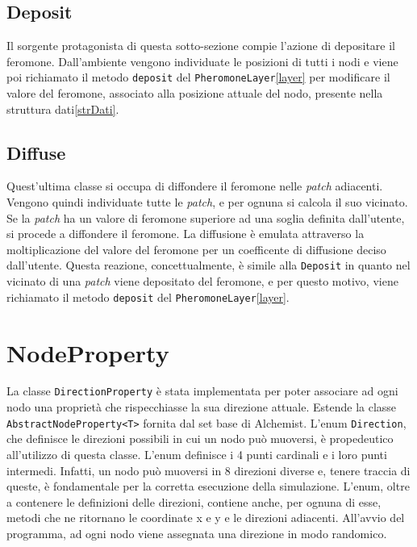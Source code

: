 \subsection{Deposit}
Il sorgente protagonista di questa sotto-sezione compie l'azione di depositare il feromone. Dall'ambiente
vengono individuate le posizioni di tutti i nodi e viene poi richiamato il metodo \texttt{deposit} del \texttt{PheromoneLayer}\space\ref{layer}
per modificare il valore del feromone, associato alla posizione attuale del nodo, presente nella struttura dati\space\ref{strDati}.\newline


\subsection{Diffuse}
Quest'ultima classe si occupa di diffondere il feromone nelle \textit{patch} adiacenti. Vengono quindi individuate tutte
le \textit{patch}, e per ognuna si calcola il suo vicinato. Se la \textit{patch} ha un valore di feromone superiore ad una soglia definita dall'utente,
si procede a diffondere il feromone. La diffusione è emulata attraverso la moltiplicazione del valore del feromone
per un coefficente di diffusione deciso dall'utente. Questa reazione, concettualmente, è simile alla \texttt{Deposit} in quanto
nel vicinato di una \textit{patch} viene depositato del feromone, e per questo motivo, viene richiamato il metodo \texttt{deposit} del \texttt{PheromoneLayer}\space\ref{layer}.
\newline


\section{NodeProperty}
La classe \texttt{DirectionProperty} è stata implementata per poter associare ad ogni nodo una proprietà che rispecchiasse la sua direzione attuale.
Estende la classe \texttt{AbstractNodeProperty<T>} fornita dal set base di Alchemist.
L'enum \texttt{Direction}, che definisce le direzioni possibili in cui un nodo può muoversi, è propedeutico all'utilizzo di questa classe.
L'enum definisce i 4 punti cardinali e i loro punti intermedi. Infatti, un nodo può muoversi in 8 direzioni diverse e, tenere traccia di
queste, è fondamentale per la corretta esecuzione della simulazione. L'enum, oltre a contenere le definizioni delle direzioni, contiene anche,
per ognuna di esse, metodi che ne ritornano le coordinate x e y e le direzioni adiacenti. All'avvio del programma, ad ogni nodo 
viene assegnata una direzione in modo randomico. 

